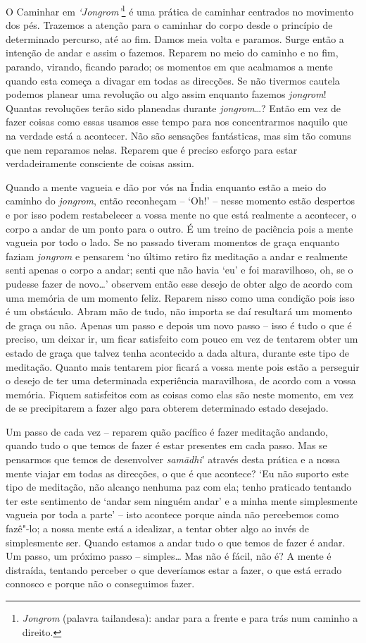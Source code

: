 O Caminhar em \emph{`Jongrom'}\footnote{%
  \emph{Jongrom} (palavra tailandesa): andar para a frente e para trás num
  caminho a direito.}
é uma prática de caminhar centrados no
movimento dos pés. Trazemos a atenção para o caminhar do corpo desde o
princípio de determinado percurso, até ao fim. Damos meia volta e
paramos. Surge então a intenção de andar e assim o fazemos. Reparem no
meio do caminho e no fim, parando, virando, ficando parado; os momentos
em que acalmamos a mente quando esta começa a divagar em todas as
direcções. Se não tivermos cautela podemos planear uma revolução ou algo
assim enquanto fazemos \emph{jongrom}! Quantas revoluções terão sido
planeadas durante \emph{jongrom}\ldots{}? Então em vez de fazer coisas
como essas usamos esse tempo para nos concentrarmos naquilo que na
verdade está a acontecer. Não são sensações fantásticas, mas sim tão
comuns que nem reparamos nelas. Reparem que é preciso esforço para estar
verdadeiramente consciente de coisas assim.

Quando a mente vagueia e dão por vós na Índia enquanto estão a meio do
caminho do \emph{jongrom}, então reconheçam -- `Oh!'
-- nesse momento estão despertos e por isso podem restabelecer a vossa
mente no que está realmente a acontecer, o corpo a andar de um ponto
para o outro. É um treino de paciência pois a mente vagueia por todo o
lado. Se no passado tiveram momentos de graça enquanto faziam
\emph{jongrom} e pensarem `no último retiro fiz meditação a andar e
realmente senti apenas o corpo a andar;
senti que não havia `eu' e foi maravilhoso, oh, se o pudesse fazer de
novo\ldots{}' observem então esse desejo de obter algo de acordo com uma
memória de um momento feliz. Reparem nisso como uma condição pois isso é
um obstáculo. Abram mão de tudo, não importa se daí resultará um momento
de graça ou não. Apenas um passo e depois um novo passo -- isso é tudo o
que é preciso, um deixar ir, um ficar satisfeito com pouco em vez de
tentarem obter um estado de graça que talvez tenha acontecido a dada
altura, durante este tipo de meditação. Quanto mais tentarem pior ficará
a vossa mente pois estão a perseguir o desejo de ter uma determinada
experiência maravilhosa, de acordo com a vossa memória. Fiquem
satisfeitos com as coisas como elas são neste momento, em vez de se
precipitarem a fazer algo para obterem determinado estado desejado.

Um passo de cada vez -- reparem quão pacífico é fazer meditação andando,
quando tudo o que temos de fazer é estar presentes em cada passo. Mas se
pensarmos que temos de desenvolver \emph{samādhi}' através desta prática
e a nossa mente viajar em todas as direcções, o que é que acontece? `Eu
não suporto este tipo de meditação, não alcanço nenhuma paz com ela;
tenho praticado tentando ter este sentimento de `andar sem ninguém
andar' e a minha mente simplesmente vagueia por toda a parte' -- isto
acontece porque ainda não percebemos como fazê"-lo; a nossa mente está a
idealizar, a tentar obter algo ao invés de simplesmente ser. Quando
estamos a andar tudo o que temos de fazer é andar. Um passo, um próximo
passo -- simples\ldots{} Mas não é fácil, não é? A mente é distraída,
tentando perceber o que deveríamos estar a fazer, o que está errado
connosco e porque não o conseguimos fazer.

